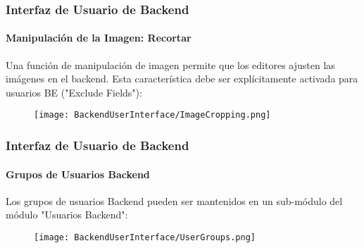 \begin{frame}[fragile]
	\frametitle{Interfaz de Usuario de Backend}
	\framesubtitle{Manipulación de la Imagen: Recortar}

	Una función de manipulación de imagen permite que los editores ajusten las 
	imágenes en el backend. Esta característica debe ser explícitamente 
	activada para usuarios BE ("Exclude Fields"):

	\begin{figure}
		\texttt{[image: BackendUserInterface/ImageCropping.png]}
	\end{figure}

\end{frame}

\begin{frame}[fragile]
	\frametitle{Interfaz de Usuario de Backend}
	\framesubtitle{Grupos de Usuarios Backend}

	Los grupos de usuarios Backend pueden ser mantenidos en un sub-módulo del 
	módulo "Usuarios Backend":

	\begin{figure}
		\texttt{[image: BackendUserInterface/UserGroups.png]}
	\end{figure}

\end{frame}

